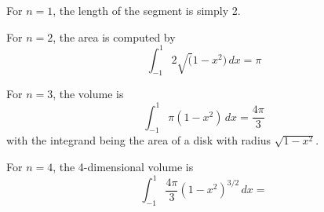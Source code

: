 

For $n=1$, the length of the segment is simply 2.

For $n=2$, the area is computed by 
$$
\int_{-1}^1 2 \sqrt(1-x^2)\,dx = \pi 
$$

For $n=3$, the volume is 
$$
\int_{-1}^1 \pi (1-x^2)\,dx = \frac{4\pi}{3} 
$$
with the integrand being the area of a disk with 
radius $\sqrt{1-x^2}$.

For $n=4$, the 4-dimensional volume is 
$$
\int_{-1}^1 \frac{4\pi}{3} (1-x^2)^{3/2}\,dx = 
$$


